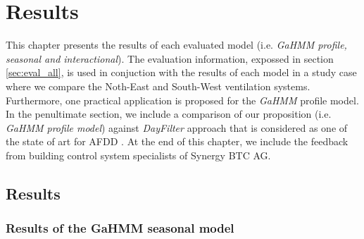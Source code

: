 \chapter{Results} %
\label{Chapter5} %
\minitoc



This chapter presents the results of each evaluated model (i.e. \textit{GaHMM profile, seasonal and interactional}). The evaluation information, expossed in section \ref{sec:eval_all}, is used in conjuction with the results of each model in a study case where we compare the Noth-East and South-West ventilation systems. Furthermore, one practical application is proposed for the \textit{GaHMM} profile model. In the penultimate section, we include a comparison of our proposition (i.e. \textit{GaHMM profile model}) against \textit{DayFilter} approach that is considered as one of the state of art for AFDD \cite{kim2017review,miller2015automated}. At the end of this chapter, we include the feedback   from building control system specialists of Synergy BTC AG.

\section{Results}

\subsection{Results of the GaHMM seasonal model}
\label{sec:seasonal_results}

